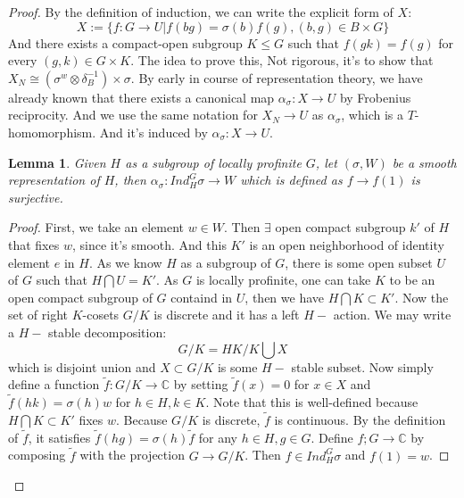 \documentclass[12pt,a4paper,english]{article}
\theoremstyle{plain}
\newtheorem{lem}[thm]{Lemma}
\theoremstyle{definition}
\begin{document}
\begin{proof}
By the definition of induction, we can write the explicit form of $X$:
\begin{equation*}
    X:=\{f:G\rightarrow U| f(bg)=\sigma(b)f(g), (b,g)\in B\times G  \}
\end{equation*}
And there exists a compact-open subgroup $K\leq G$ such that $f(gk)=f(g)$ for every $(g,k)\in G\times K$. 
The idea to prove this, Not rigorous, it's to show that $X_{N}\cong(\sigma^{w}\otimes\delta^{-1}_{B})\times \sigma$. By early in course of representation theory, we have already known that there exists a canonical map $\alpha_{\sigma}:X\rightarrow U$ by Frobenius reciprocity. And we use the same notation for $X_{N}\rightarrow U$ as $\alpha_{\sigma}$, which is a $T$-homomorphism. And it's induced by $\alpha_{\sigma}:X\rightarrow U$.  

\begin{lem}\label{lem1}
Given $H$ as a subgroup of locally profinite $G$, let $(\sigma, W)$ be a smooth representation of $H$, then $\alpha_{\sigma}: Ind^{G}_{H}\sigma \rightarrow W$ which is defined as $f\rightarrow f(1)$ is surjective.
\end{lem}
\begin{proof}
First, we take an element $w\in W$. Then $\exists $ open compact subgroup $k'$ of $H$ that fixes $w$, since it's smooth. And this $K'$ is an open neighborhood of identity element $e$ in $H$. As we know $H$ as a subgroup of $G$, there is some open subset $U$ of $G$ such that $H\bigcap U=K'$. As $G$ is locally profinite, one can take $K$ to be an open compact subgroup of $G$ containd in $U$, then we have $H\bigcap K\subset K'$. Now the set of right $K$-cosets $G/K$ is discrete and it has a left $H-$ action. We may write a $H-$ stable decomposition:
\begin{equation*}
    G/K=HK/K\bigcup X
\end{equation*}
which is disjoint union and $X\subset G/K$ is some $H-$ stable subset. Now simply define a function $\tilde{f}:G/K\rightarrow \mathbb{C}$ by setting $\tilde{ f}(x)=0$ for $x\in X$ and $\tilde{f}(hk)=\sigma(h)w$ for $h\in H, k\in K$. Note that this is well-defined because $H\bigcap K\subset K'$ fixes $w$. Because $G/K$ is discrete, $\tilde{f}$ is continuous. By the definition of $\tilde{f}$, it satisfies $\tilde{f}(hg)=\sigma(h)\tilde{f}$ for any $h\in H, g\in G$. Define $f; G\rightarrow \mathbb{C}$ by composing $\tilde{f}$ with the projection $G\rightarrow G/K$. Then $f\in Ind^{G}_{H}\sigma$ and $f(1)=w$.
\end{proof}


\end{proof}
\end{document}
